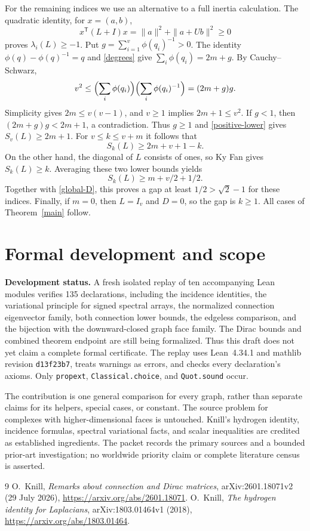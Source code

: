 \documentclass[11pt]{article}
\newcommand{\Sk}[2]{S_{#1}(#2)}
\begin{document}
For the remaining indices we use an alternative to a full inertia calculation.
The quadratic identity, for $x=(a,b)$,
\[
 x^{\mathsf T}(L+I)x=\|a\|^2+\|a+Ub\|^2\ge0
\]
proves $\lambda_i(L)\ge-1$.
Put $g=\sum_{i=1}^v\phi(q_i)^{-1}>0$.
The identity $\phi(q)-\phi(q)^{-1}=q$ and \eqref{degrees} give
$\sum_i\phi(q_i)=2m+g$. By Cauchy--Schwarz,
\[
 v^2\le\Bigl(\sum_i\phi(q_i)\Bigr)
             \Bigl(\sum_i\phi(q_i)^{-1}\Bigr)=(2m+g)g.
\]
Simplicity gives $2m\le v(v-1)$, and $v\ge1$ implies $2m+1\le v^2$.
If $g<1$, then $(2m+g)g<2m+1$, a contradiction. Thus $g\ge1$ and
\eqref{positive-lower} gives $\Sk{v}{L}\ge2m+1$.
For $v\le k\le v+m$ it follows that
\[
 \Sk{k}{L}\ge2m+v+1-k.
\]
On the other hand, the diagonal of $L$ consists of ones, so Ky Fan gives
$\Sk{k}{L}\ge k$. Averaging these two lower bounds yields
\[
 \Sk{k}{L}\ge m+v/2+1/2.
\]
Together with \eqref{global-D}, this proves a gap at least
$1/2>\sqrt2-1$ for these indices.
Finally, if $m=0$, then $L=I_v$ and $D=0$, so the gap is $k\ge1$.
All cases of Theorem~\ref{main} follow.

\section{Formal development and scope}
\textbf{Development status.} A fresh isolated replay of ten accompanying
Lean modules verifies 135 declarations, including the incidence identities,
the variational principle for signed spectral arrays, the normalized
connection eigenvector family, both connection lower bounds, the edgeless
comparison, and the bijection with the downward-closed graph face family.
The Dirac bounds and combined theorem endpoint are still being formalized.
Thus this draft does not yet claim a complete formal certificate.
The replay uses Lean~4.34.1 and mathlib revision \texttt{d13f23b7}, treats
warnings as errors, and checks every declaration's axioms. Only
\texttt{propext}, \texttt{Classical.choice}, and \texttt{Quot.sound} occur.

The contribution is one general comparison for every graph, rather than
separate claims for its helpers, special cases, or constant.
The source problem for complexes with higher-dimensional faces is untouched.
Knill's hydrogen identity, incidence formulas, spectral variational facts,
and scalar inequalities are credited as established ingredients.
The packet records the primary sources and a bounded prior-art investigation;
no worldwide priority claim or complete literature census is asserted.

\begin{thebibliography}{9}
 O.~Knill,
\emph{Remarks about connection and Dirac matrices},
arXiv:2601.18071v2 (29 July 2026),
\url{https://arxiv.org/abs/2601.18071}.
 O.~Knill,
\emph{The hydrogen identity for Laplacians},
arXiv:1803.01464v1 (2018),
\url{https://arxiv.org/abs/1803.01464}.
\end{thebibliography}
\end{document}
